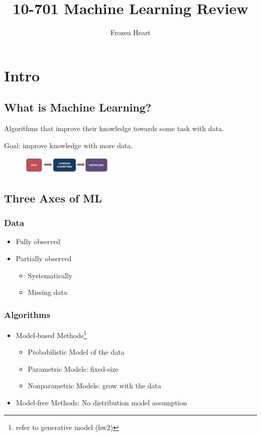 \documentclass[letterpaper, 10pt, twocolumn]{article}
\title{\textbf{10-701 Machine Learning Review}}
\author{Frozen Heart}
\begin{document}
\maketitle

\section{Intro}

\subsection{What is Machine Learning?}

Algorithms that improve their knowledge towards some task with data.

Goal: improve knowledge with more data.

\begin{figure}[!h]
	\centering
	\includegraphics[width=0.4\textwidth]{./img/01_intro/machinelearning.png}
\end{figure}

\subsection{Three Axes of ML}

\subsubsection{Data}

\begin{itemize}
	\item Fully observed
	\item Partially observed
	\begin{itemize}
		\item Systematically
		\item Missing data
	\end{itemize}
\end{itemize}

\subsubsection{Algorithms}

\begin{itemize}
	\item Model-based Methods\footnote{refer to generative model (hw2)}
	\begin{itemize}
		\item Probabilistic Model of the data
		\item Parametric Models: fixed-size
		\item Nonparametric Models:	grow with the data
	\end{itemize}
	\item Model-free Methods: No distribution model assumption
\end{itemize}
\end{document}
